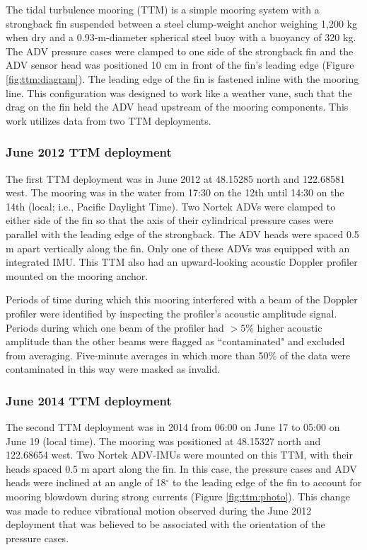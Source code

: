 The tidal turbulence mooring (TTM) is a simple mooring system with a strongback fin suspended between a steel clump-weight anchor weighing 1,200 kg when dry and a 0.93-m-diameter spherical steel buoy with a buoyancy of 320 kg. The ADV pressure cases were clamped to one side of the strongback fin and the ADV sensor head was positioned 10 cm in front of the fin's leading edge (Figure \ref{fig:ttm:diagram}). The leading edge of the fin is fastened inline with the mooring line. This configuration  was designed to work like a weather vane, such that the drag on the fin held the ADV head upstream of the mooring components.  This work utilizes data from two TTM deployments. 

\subsubsection{June 2012 TTM deployment}

The first TTM deployment was in June 2012 at 48.15285 north and 122.68581 west. The mooring was in the water from 17:30 on the 12th until 14:30 on the 14th (local; i.e., Pacific Daylight Time). Two Nortek ADVs were clamped to either side of the fin so that the axis of their cylindrical pressure cases were parallel with the leading edge of the strongback. The ADV heads were spaced 0.5 m apart vertically along the fin. Only one of these ADVs was equipped with an integrated IMU. This TTM also had an upward-looking acoustic Doppler profiler mounted on the mooring anchor.

Periods of time during which this mooring interfered with a beam of the Doppler profiler were identified by inspecting the profiler's acoustic amplitude signal. Periods during which one beam of the profiler had $>5\%$ higher acoustic amplitude than the other beams were flagged as ``contaminated" and excluded from averaging.  Five-minute averages in which more than 50\% of the data were contaminated in this way were masked as invalid.

\subsubsection{June 2014 TTM deployment}

The second TTM deployment was in 2014 from 06:00 on June 17 to 05:00 on June 19 (local time). The mooring was positioned at 48.15327 north and 122.68654 west.  Two Nortek ADV-IMUs were mounted on this TTM, with their heads spaced 0.5 m apart along the fin. In this case, the pressure cases and ADV heads were inclined at an angle of 18$^\circ$ to the leading edge of the fin to account for mooring blowdown during strong currents (Figure \ref{fig:ttm:photo}). This change was made to reduce vibrational motion observed during the June 2012 deployment that was believed to be associated with the orientation of the pressure cases.

